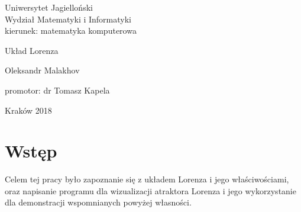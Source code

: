\documentclass[12pt]{report}
\begin{document}
\begin{titlepage}
	\begin{center}
	\large 
	Uniwersytet Jagielloński\\
	Wydział Matematyki i Informatyki\\
	kierunek: matematyka komputerowa
	
	\vspace{5.0cm}
	\huge
	Układ Lorenza
	
	\vspace{1.0cm}
	\large
	Oleksandr Malakhov
	\end{center}
	
	\vspace{3.0cm}
	\begin{flushright}
	promotor: dr Tomasz Kapela
	\end{flushright}
	
	\vspace{4.0cm}
	\begin{center}
		\footnotesize
		Kraków 2018
	\end{center}
\end{titlepage}

\tableofcontents

\chapter{Wstęp}
	\hspace{\parindent} Celem tej pracy było zapoznanie się z układem Lorenza i jego właściwościami, oraz napisanie programu dla wizualizacji atraktora Lorenza i jego wykorzystanie dla demonstracji wspomnianych powyżej własności.
\end{document}
